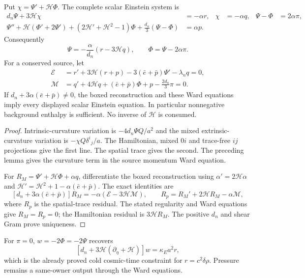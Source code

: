 \documentclass[12pt,a4paper]{article}
\begin{document}
\begin{theorem}
\label{p8:thm:v2147-full-scalar-einstein-bulk}
Put $\chi=\Psi'+\mathcal H\Phi$.  The complete scalar Einstein system is
\begin{align}
 d_n\Psi+3\mathcal H\chi&=-\alpha r,&
 \chi&=-\alpha q,& \Psi-\Phi&=2\alpha\pi,\\
 \Psi''+\mathcal H(\Phi'+2\Psi')
 +(2\mathcal H'+\mathcal H^2-1)\Phi
 +\frac{d_n}{3}(\Psi-\Phi)&=\alpha p.
\end{align}
Consequently
\[
 \boxed{\Psi=-\frac{\alpha}{d_n}(r-3\mathcal Hq),
 \qquad \Phi=\Psi-2\alpha\pi.}
\]
For a conserved source, let
\begin{align*}
 \mathcal E&=r'+3\mathcal H(r+p)
              -3(\bar e+\bar p)\Psi'-\lambda_nq=0,\\
 \mathcal M&=q'+4\mathcal Hq+(\bar e+\bar p)\Phi+p
              -\frac{2d_n}{3}\pi=0.
\end{align*}
If $d_n+3\alpha(\bar e+\bar p)\ne0$, the boxed reconstruction and these Ward
equations imply every displayed scalar Einstein equation.  In particular
nonnegative background enthalpy is sufficient.  No inverse of $\mathcal H$
is consumed.
\end{theorem}
\begin{proof}
Intrinsic-curvature variation is $-4d_n\Psi Q/a^2$ and the mixed
extrinsic-curvature variation is $-\chi Q\delta^i{}_j/a$.  The Hamiltonian,
mixed $0i$ and trace-free $ij$ projections give the first line.  The spatial
trace gives the second.  The preceding lemma gives the curvature term in the
source momentum Ward equation.

For $R_M=\Psi'+\mathcal H\Phi+\alpha q$, differentiate the boxed
reconstruction using $\alpha'=2\mathcal H\alpha$ and
$\mathcal H'=\mathcal H^2+1-\alpha(\bar e+\bar p)$.  The exact identities are
\[
 [d_n+3\alpha(\bar e+\bar p)]R_M
 =-\alpha(\mathcal E-3\mathcal H\mathcal M),
 \qquad R_p=R_M'+2\mathcal HR_M-\alpha\mathcal M,
\]
where $R_p$ is the spatial-trace residual.  The stated regularity and Ward
equations give $R_M=R_p=0$; the Hamiltonian residual is $3\mathcal HR_M$.
The positive $d_n$ and shear Gram prove uniqueness.
\end{proof}

For $\pi=0$, $w=-2\Phi=-2\Psi$ recovers
\[
 [d_n+3\mathcal H(\partial_\eta+\mathcal H)]w
 =\kappa_Ea^2r,
\]
which is the already proved cold cosmic-time constraint for $r=c^2\delta\rho$.
Pressure remains a same-owner output through the Ward equations.
\end{document}
